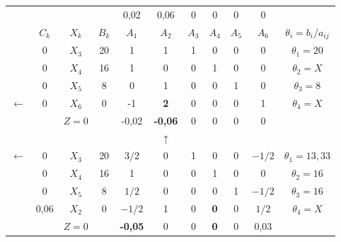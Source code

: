     \begin{tabular}{ccccccccccc}
\cline{2-11}            &         &         &         & 0,02    & 0,06    & 0       & 0       & 0       & 0       &  \bigstrut[t]\\
            & $C_k$   & $X_k$   & $B_k$   & $A_1$   & $A_2$   & $A_3$   & $A_4$   & $A_5$   & $A_6$   & $\theta_i = b_i/a_{ij}$ \bigstrut[b]\\
\cline{2-11}            & 0       & $X_3$   & 20      & 1       & 1       & 1       & 0       & 0       & 0       & $\theta_1 = 20$ \bigstrut[t]\\
            & 0       & $X_4$   & 16      & 1       & 0       & 0       & 1       & 0       & 0       & $\theta_2 = X$ \\
            & 0       & $X_5$   & 8       & 0       & 1       & 0       & 0       & 1       & 0       & $\theta_3 = 8$ \\
    $\leftarrow$ & 0       & \textcolor[rgb]{ 1,  0,  0}{\boldmath{}\textbf{$X_6$}\unboldmath{}} & 0       & -1      & \textbf{2} & 0       & 0       & 0       & 1       & \boldmath{}\textbf{$\theta_4 = X$}\unboldmath{} \bigstrut[b]\\
\cline{2-11}            &         & $Z=0$   &         & -0,02   & \textcolor[rgb]{ 0,  .439,  .753}{\textbf{-0,06}} & 0       & 0       & 0       & 0       &  \bigstrut\\
\cline{2-11}            &         &         &         &         & $\uparrow$ &         &         &         &         &  \bigstrut\\
\cline{2-11}    $\leftarrow$ & 0       & \textcolor[rgb]{ 1,  0,  0}{\boldmath{}\textbf{$X_3$}\unboldmath{}} & 20      & \boldmath{}\textbf{$3/2$}\unboldmath{} & 0       & 1       & 0       & 0       & $-1/2$  & \boldmath{}\textbf{$\theta_1 = 13,33$}\unboldmath{} \bigstrut[t]\\
            & 0       & $X_4$   & 16      & 1       & 0       & 0       & 1       & 0       & 0       & $\theta_2 = 16$ \\
            & 0       & $X_5$   & 8       & $1/2$   & 0       & 0       & 0       & 1       & $-1/2$  & $\theta_3 = 16$ \\
            & 0,06    & $X_2$   & 0       & $-1/2$  & 1       & 0       & \textbf{0} & 0       & $1/2$   & $\theta_4 = X$ \bigstrut[b]\\
\cline{2-11}            &         & $Z=0$   &         & \textcolor[rgb]{ 0,  .439,  .753}{\textbf{-0,05}} & 0       & 0       & \textcolor[rgb]{ 0,  .439,  .753}{\textbf{0}} & 0       & 0,03    &  \bigstrut\\

\end{tabular}
